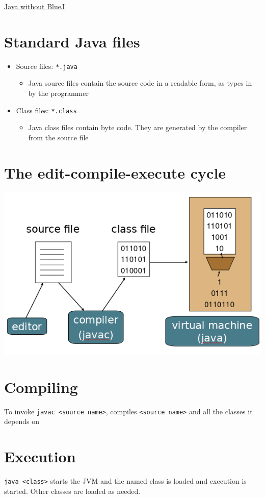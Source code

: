 \documentclass{article}[18pt]
\begin{document}
\begin{center}
\underline{\huge Java without BlueJ}
\end{center}
\section{Standard Java files}
\begin{itemize}
	\item Source files: \texttt{*.java}
	\begin{itemize}
		\item Java source files contain the source code in a readable form, as types in by the programmer
	\end{itemize}
	\item Class files: \texttt{*.class}
	\begin{itemize}
		\item Java class files contain byte code. They are generated by the compiler from the source file
	\end{itemize}
\end{itemize}
\section{The edit-compile-execute cycle}
\begin{center}
	\includegraphics[scale=0.7]{edit-compile-execute}
\end{center}
\section{Compiling}
To invoke \texttt{javac <source name>}, compiles \texttt{<source name>} and all the classes it depends on
\section{Execution}
\texttt{java <class>} starts the JVM and the named class is loaded and execution is started. Other classes are loaded as needed.
\end{document}

